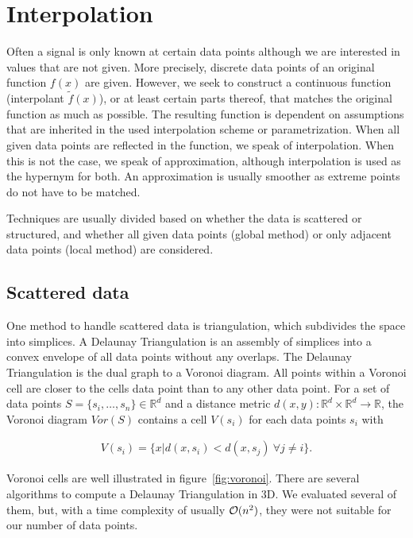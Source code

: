 \section{Interpolation}

Often a signal is only known at certain data points although we are interested in values that are not given. More precisely, discrete data points of an original function $f(x)$ are given. However, we seek to construct a continuous function (interpolant $\widetilde{f}(x)$), or at least certain parts thereof, that matches the original function as much as possible. The resulting function is dependent on assumptions that are inherited in the used interpolation scheme or parametrization. When all given data points are reflected in the function, we speak of interpolation. When this is not the case, we speak of approximation, although interpolation is used as the hypernym for both. An approximation is usually smoother as extreme points do not have to be matched.

Techniques are usually divided based on whether the data is scattered or structured, and whether all given data points (global method) or only adjacent data points (local method) are considered.

\subsection{Scattered data}

One method to handle scattered data is triangulation, which subdivides the space into simplices. A Delaunay Triangulation is an assembly of simplices into a convex envelope of all data points without any overlaps. The Delaunay Triangulation is the dual graph to a Voronoi diagram. All points within a Voronoi cell are closer to the cells data point than to any other data point. For a set of data points $S = \{s_i, \dots, s_n \} \in \mathbb{R}^d$ and a distance metric $d(x, y):\mathbb{R}^d \times \mathbb{R}^d \rightarrow \mathbb{R}$, the Voronoi diagram $Vor(S)$ contains a cell $V(s_i)$ for each data points $s_i$ with

\begin{align}
V(s_i) = \{x | d(x,s_i) < d(x,s_j)~\forall j \neq i\}.
\end{align}

Voronoi cells are well illustrated in figure~\ref{fig:voronoi}. There are several algorithms to compute a Delaunay Triangulation in 3D. We evaluated several of them, but, with a time complexity of usually $\mathcal{O}(n^2)$, they were not suitable for our number of data points. 

